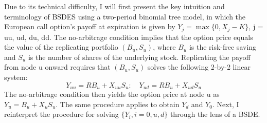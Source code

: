 \documentclass{article}
\begin{document}
Due to its technical difficulty, I will first present the key intuition and terminology of BSDES using a two-period binomial tree model, in which the European call option's payoff at expiration is given by $Y_{j}=\max\{0,X_{j}-K\}$, j = uu, ud, du, dd. The no-arbitrage condition implies that the option price equals the value of the replicating portfolio $(B_{u},S_{u})$, where $B_{u}$ is the risk-free saving and $S_{u}$ is the number of shares of the underlying stock. Replicating the payoff from node u onward requires that $(B_{u},S_{u})$ solves the following 2-by-2 linear system:
\begin{equation}
Y_{uu}=RB_{u}+X_{uu}S_{u}: \quad Y_{ud}=RB_{u}+X_{ud}S_{u}
\label{eq:1}
\end{equation}
The no-arbitrage condition then yields the option price at node u as $Y_{u}=B_{u}+X_{u}S_{u}$. The same procedure applies to obtain $Y_{d}$ and $Y_{0}$. Next, I reinterpret the procedure for solving $\{Y_{i},i=0,u,d\}$ through the lens of a BSDE.
\end{document}
